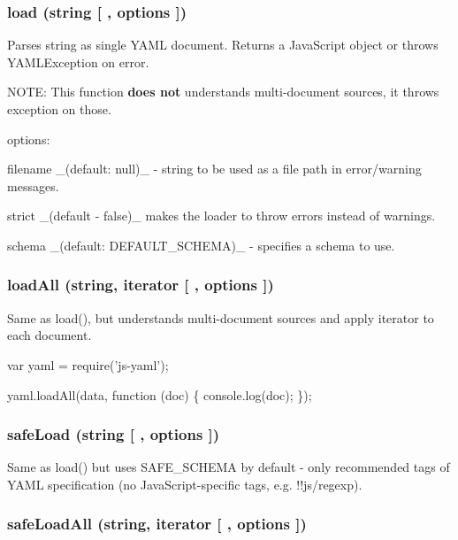 \subsubsection*{load (string \mbox{[} , options \mbox{]})}

Parses {\ttfamily string} as single Y\+A\+ML document. Returns a Java\+Script object or throws {\ttfamily Y\+A\+M\+L\+Exception} on error.

N\+O\+TE\+: This function {\bfseries does not} understands multi-\/document sources, it throws exception on those.

options\+:


\begin{DoxyItemize}
\item {\ttfamily filename} \+\_\+(default\+: null)\+\_\+ -\/ string to be used as a file path in error/warning messages.
\item {\ttfamily strict} \+\_\+(default -\/ false)\+\_\+ makes the loader to throw errors instead of warnings.
\item {\ttfamily schema} \+\_\+(default\+: {\ttfamily D\+E\+F\+A\+U\+L\+T\+\_\+\+S\+C\+H\+E\+MA})\+\_\+ -\/ specifies a schema to use.
\end{DoxyItemize}

\subsubsection*{load\+All (string, iterator \mbox{[} , options \mbox{]})}

Same as {\ttfamily load()}, but understands multi-\/document sources and apply {\ttfamily iterator} to each document.


\begin{DoxyCode}
var yaml = require('js-yaml');

yaml.loadAll(data, function (doc) \{
  console.log(doc);
\});
\end{DoxyCode}


\subsubsection*{safe\+Load (string \mbox{[} , options \mbox{]})}

Same as {\ttfamily load()} but uses {\ttfamily S\+A\+F\+E\+\_\+\+S\+C\+H\+E\+MA} by default -\/ only recommended tags of Y\+A\+ML specification (no Java\+Script-\/specific tags, e.\+g. {\ttfamily !!js/regexp}).

\subsubsection*{safe\+Load\+All (string, iterator \mbox{[} , options \mbox{]})}

